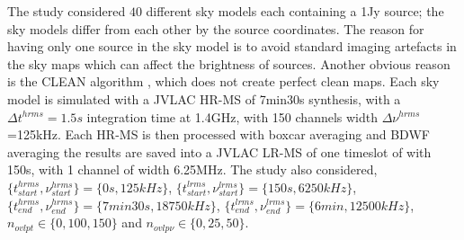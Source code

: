 \documentclass[useAMS,usenatbib]{mn2e}
\begin{document}
The study considered $40$ different sky models each  containing a 1Jy source; the sky models differ from each other by the source 
coordinates. 
The reason for having  only one source in the sky model is to avoid standard imaging artefacts in the sky maps which 
can affect the brightness of sources. Another obvious reason is the  CLEAN algorithm \citep{cornwell1999deconvolution}, which does not 
create 
perfect clean maps. Each  sky model is simulated 
with a JVLAC HR-MS of 7min30s synthesis, with a $\Delta t^{hrms}=1.5s$ integration 
time at 1.4GHz,  with 150 channels width $\Delta \nu^{hrms}$=125kHz.  Each HR-MS is then processed with boxcar averaging and BDWF 
averaging the results are saved into a JVLAC LR-MS of one timeslot of with  150s,  with 1 channel of width 6.25MHz. The study also 
considered, $\{t^{hrms}_{start},\nu^{hrms}_{start}\}=\{0s,125kHz\}$, $\{t^{lrms}_{start},\nu^{lrms}_{start}\}=\{150s,6250kHz\}$, 
$\{t^{hrms}_{end},\nu^{hrms}_{end}\}=\{7min30s,18750kHz\}$, $\{t^{lrms}_{end},\nu^{lrms}_{end}\}=\{6min,12500kHz\}$, 
$n_{ovlpt}\in\{0,100,150\}$ 
and $n_{ovlp\nu}\in\{0,25,50\}$. 
\end{document}
